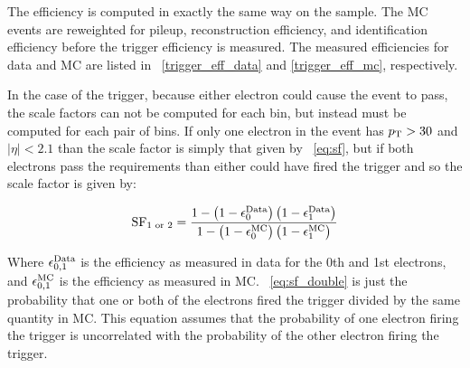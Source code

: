 The efficiency is computed in exactly the same way on the \MADGRAPH sample. The
MC events are reweighted for pileup, reconstruction efficiency, and
identification efficiency before the trigger efficiency is measured. The
measured efficiencies for data and MC are listed in
\TABS~\ref{trigger_eff_data} and \ref{trigger_eff_mc}, respectively.

In the case of the trigger, because either electron could cause the event to
pass, the scale factors can not be computed for each bin, but instead must be computed
for each pair of bins. If only one electron in the event has $p_{\mathrm{T}} > 30$ and
$|\eta| < 2.1$ than the scale factor is simply that given by \EQ~\ref{eq:sf}, but if both
electrons pass the requirements than either could have fired the trigger and so
the scale factor is given by:

\begin{equation} \label{eq:sf_double}
    \text{SF}_{1 \text{ or } 2}
    =
    \frac{
        1 - \left( 1 - \epsilon^{\text{Data}}_{0} \right) \left( 1 - \epsilon^{\text{Data}}_{1} \right)
    } {
        1 - \left( 1 - \epsilon^{\text{MC}}_{0} \right) \left( 1 - \epsilon^{\text{MC}}_{1} \right)
    }
\end{equation}

Where $\epsilon^{\text{Data}}_{0,1}$ is the efficiency as measured in data for the 0th and
1st electrons, and $\epsilon^{\text{MC}}_{0,1}$ is the efficiency as measured in MC.
\EQ~\ref{eq:sf_double} is just the probability that one or both of the
electrons fired the trigger divided by the same quantity in MC. This equation
assumes that the probability of one electron firing the trigger is uncorrelated
with the probability of the other electron firing the trigger.

